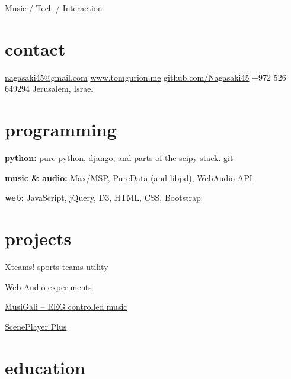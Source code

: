 \documentclass[]{friggeri-cv}  %
\begin{document}
       {Music / Tech / Interaction}


\begin{aside}
\section{contact}
\href{mailto:nagasaki45@gmail.com}{nagasaki45@gmail.com}
\href{http://www.tomgurion.me}{www.tomgurion.me}
\href{https://github.com/Nagasaki45}{github.com/Nagasaki45}
+972 526 649294
Jerusalem, Israel

\section{programming}

\textbf{python:} pure python, django, and parts of the scipy stack. git

\textbf{music \& audio:} Max/MSP, PureData (and libpd), WebAudio API

\textbf{web:} JavaScript, jQuery, D3, HTML, CSS, Bootstrap

\section{projects}
\href{http://xteams.nagasaki45.com/}{Xteams! sports teams utility}

\href{http://web-audio.nagasaki45.com/}{Web-Audio experiments}

\href{http://tomgurion.blogspot.co.il/2013/10/musigali-eeg-controlled-music-for-brain.html}{MusiGali -- EEG controlled music}

\href{https://github.com/Nagasaki45/ScenePlayer-Plus}{ScenePlayer Plus}

\end{aside}


\section{education}
\end{document}
